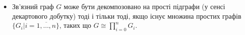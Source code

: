 \begin{itemize}
\item Зв'язний граф $G$ може бути декомпозовано на прості підграфи (у сенсі декартового добутку) тоді і тільки тоді, якщо існує множина простих графів $\lbrace G_i \vert i=\overline{1,\dots,n} \rbrace$, таких що $G \cong \displaystyle\prod_{i=0}^n G_i$.
\end{itemize}
